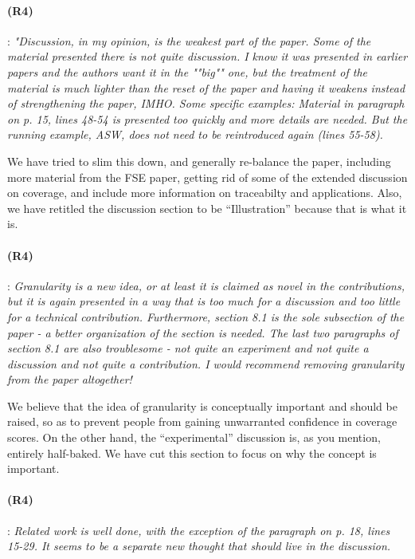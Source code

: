 \documentclass{article}
\begin{document}
\paragraph{(R4)}: \textit{"Discussion, in my opinion, is the weakest part of the paper. Some of the material presented there is not quite discussion. I know it was presented in earlier papers and the authors want it in the ""big"" one, but the treatment of the material is much lighter than the reset of the paper and having it weakens instead of strengthening the paper, IMHO. Some specific examples: Material in paragraph on p. 15, lines 48-54 is presented too quickly and more details are needed.  But the running example, ASW, does not need to be reintroduced again (lines 55-58).}
\vspace{0.05in}


We have tried to slim this down, and generally re-balance the paper, including more material from the FSE paper, getting rid of some of the extended discussion on coverage, and include more information on traceabilty and applications.  Also, we have retitled the discussion section to be ``Illustration'' because that is what it is.

\paragraph{(R4)}: \textit{Granularity is a new idea, or at least it is claimed as novel in the contributions, but it is again presented in a way that is too much for a discussion and too little for a technical contribution. Furthermore, section 8.1 is the sole subsection of the paper - a better organization of the section is needed.  The last two paragraphs of section 8.1 are also troublesome - not quite an experiment and not quite a discussion and not quite a contribution.  I would recommend removing granularity from the paper altogether!}
\vspace{0.05in}

We believe that the idea of granularity is conceptually important and should be raised, so as to prevent people from gaining unwarranted confidence in coverage scores.  On the other hand, the ``experimental'' discussion is, as you mention, entirely half-baked.  We have cut this section to focus on why the concept is important.


\paragraph{(R4)}: \textit{Related work is well done, with the exception of the paragraph on p. 18, lines 15-29. It seems to be a separate new thought that should live in the discussion.} 
\vspace{0.05in}
\end{document}
